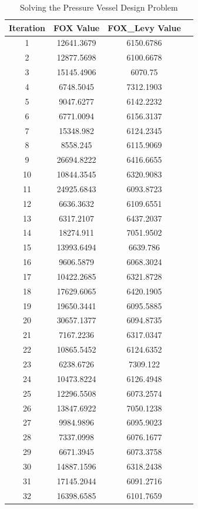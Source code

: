 \documentclass[
]{article}
\begin{document}
\begin{justify}
{\begin{table}[htbp]
\centering
\caption{Solving the Pressure Vessel Design Problem}
\vspace{1mm}
\label{tab:results}
\begin{tabular}{cccc}
\toprule
Iteration & FOX Value & FOX\_Levy Value \\
\midrule
1 & 12641.3679 & 6150.6786 \\
2 & 12877.5698 & 6100.6678 \\
3 & 15145.4906 & 6070.75 \\
4 & 6748.5045 & 7312.1903 \\
5 & 9047.6277 & 6142.2232 \\
6 & 6771.0094 & 6156.3137 \\
7 & 15348.982 & 6124.2345 \\
8 & 8558.245 & 6115.9069 \\
9 & 26694.8222 & 6416.6655 \\
10 & 10844.3545 & 6320.9083 \\
11 & 24925.6843 & 6093.8723 \\
12 & 6636.3632 & 6109.6551 \\
13 & 6317.2107 & 6437.2037 \\
14 & 18274.911 & 7051.9502 \\
15 & 13993.6494 & 6639.786 \\
16 & 9606.5879 & 6068.3024 \\
17 & 10422.2685 & 6321.8728 \\
18 & 17629.6065 & 6420.1905 \\
19 & 19650.3441 & 6095.5885 \\
20 & 30657.1377 & 6094.8735 \\
21 & 7167.2236 & 6317.0347 \\
22 & 10865.5452 & 6124.6352 \\
23 & 6238.6726 & 7309.122 \\
24 & 10473.8224 & 6126.4948 \\
25 & 12296.5508 & 6073.2574 \\
26 & 13847.6922 & 7050.1238 \\
27 & 9984.9896 & 6095.9023 \\
28 & 7337.0998 & 6076.1677 \\
29 & 6671.3945 & 6073.3758 \\
30 & 14887.1596 & 6318.2438 \\
31 & 17145.2044 & 6091.2716 \\
32 & 16398.6585 & 6101.7659 \\

\end{tabular}
\end{table}}
\end{justify}
\end{document}
